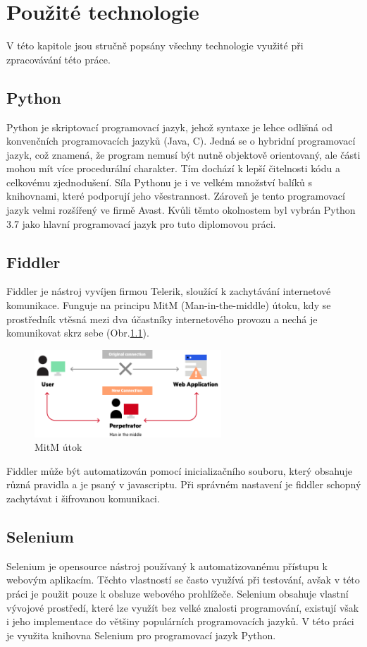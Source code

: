 \documentclass[thesis=M,czech,hidelinks]{FITthesis}[2013/05/06]
\begin{document}
\chapter{Použité technologie}
V této kapitole jsou stručně popsány všechny technologie využité při zpracovávání této práce.

\section{Python}\label{sec:python}
Python je skriptovací programovací jazyk, jehož syntaxe je lehce odlišná od konvenčních programovacích jazyků (Java, C). Jedná se o hybridní programovací jazyk, což znamená, že program nemusí být nutně objektově orientovaný, ale části mohou mít více procedurální charakter. Tím dochází k lepší čitelnosti kódu a celkovému zjednodušení. Síla Pythonu je i ve velkém množství balíků s knihovnami, které podporují jeho všestrannost. Zároveň je tento programovací jazyk velmi rozšířený ve firmě Avast. Kvůli těmto okolnostem byl vybrán Python 3.7 jako hlavní programovací jazyk pro tuto diplomovou práci.

\section{Fiddler}\label{sec:fiddler}
Fiddler\cite{fiddler} je nástroj vyvíjen firmou Telerik, sloužící k zachytávání internetové komunikace. Funguje na principu MitM (Man-in-the-middle) útoku, kdy se prostředník vtěsná mezi dva účastníky internetového provozu a nechá je komunikovat skrz sebe (Obr.\ref{fig:mitm}).
\begin{figure}[h]
	\centering
	\includegraphics[width=7cm]{pictures/mitm.png}
	\caption{MitM útok \cite{mitm}}
	\label{fig:mitm}
\end{figure}
Fiddler může být automatizován pomocí inicializačního souboru, který obsahuje různá pravidla a je psaný v javascriptu. Při správném nastavení je fiddler schopný zachytávat i šifrovanou komunikaci.

\section{Selenium} \label{sec:selenium}
Selenium je opensource nástroj používaný k automatizovanému přístupu k webovým aplikacím. Těchto vlastností se často využívá při testování, avšak v této práci je použit pouze k obsluze webového prohlížeče. Selenium obsahuje vlastní vývojové prostředí, které lze využít bez velké znalosti programování, existují však i jeho implementace do většiny populárních programovacích jazyků. V této práci je využita knihovna Selenium pro programovací jazyk Python.
\end{document}
